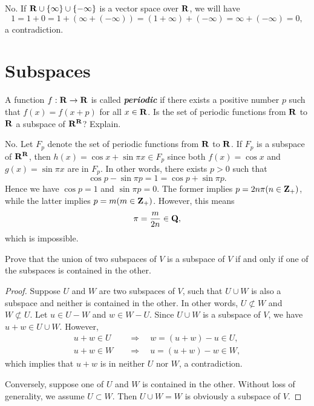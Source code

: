\begin{solution}
	No. If \( \mathbf{R} \cup \{\infty\} \cup \{-\infty\} \) is a vector space over \( \mathbf{R} \), we will have
	\[
		1 = 1 + 0 = 1 + (\infty + (-\infty)) = (1 + \infty) + (-\infty) = \infty + (-\infty) = 0,
	\]
	a contradiction.
\end{solution}



\section{Subspaces}

\begin{exercise}{9}
A function \( f: \mathbf{R} \to \mathbf{R} \) is called \textbf{\textit{periodic}} if there exists a positive number \( p \) such that \( f(x) = f(x + p) \) for all \( x \in \mathbf{R} \). Is the set of periodic functions from \( \mathbf{R} \) to \( \mathbf{R} \) a subspace of \( \mathbf{R}^{\mathbf{R}} \)? Explain.
\end{exercise}

\begin{solution}
	No. Let \( F_{p} \) denote the set of periodic functions from \( \mathbf{R} \) to \( \mathbf{R} \). If \( F_{p} \) is a subspace of \( \mathbf{R}^{\mathbf{R}} \), then \( h(x) = \cos x + \sin\pi x \in F_{p} \) since both \( f(x) = \cos x \) and \( g(x) = \sin\pi x \) are in \( F_{p} \). In other words, there exists \( p > 0 \) such that
	\[
		\cos p - \sin\pi p = 1 = \cos p + \sin\pi p.
	\]
	Hence we have \( \cos p = 1 \) and \( \sin\pi p = 0 \). The former implies \( p = 2n\pi (n \in \mathbf{Z}_{+}) \), while the latter implies \( p = m (m \in \mathbf{Z}_{+}) \). However, this means
	\[
		\pi = \frac{m}{2n} \in \mathbf{Q},
	\]
	which is impossible.
\end{solution}

\begin{exercise}{12}
	Prove that the union of two subspaces of \( V \) is a subspace of \( V \) if and only if one of the subspaces is contained in the other.
\end{exercise}

\begin{proof}
	Suppose \( U \) and \( W \) are two subspaces of \( V \), such that \( U \cup W \) is also a subspace and neither is contained in the other. In other words, \( U \not\subset W \) and \( W \not\subset U \). Let \( u \in U - W \) and \( w \in W - U \). Since \( U \cup W \) is a subspace of \( V \), we have \( u + w \in U \cup W \). However,
	\begin{align*}
		u + w \in U \quad &\Rightarrow \quad w = (u + w) - u \in U, \\
		u + w \in W \quad &\Rightarrow \quad u = (u + w) - w \in W,
	\end{align*}
	which implies that \( u + w \) is in neither \( U \) nor \( W \), a contradiction.

	Conversely, suppose one of \( U \) and \( W \) is contained in the other. Without loss of generality, we assume \( U \subset W \). Then \( U \cup W = W \) is obviously a subspace of \( V \).
\end{proof}

